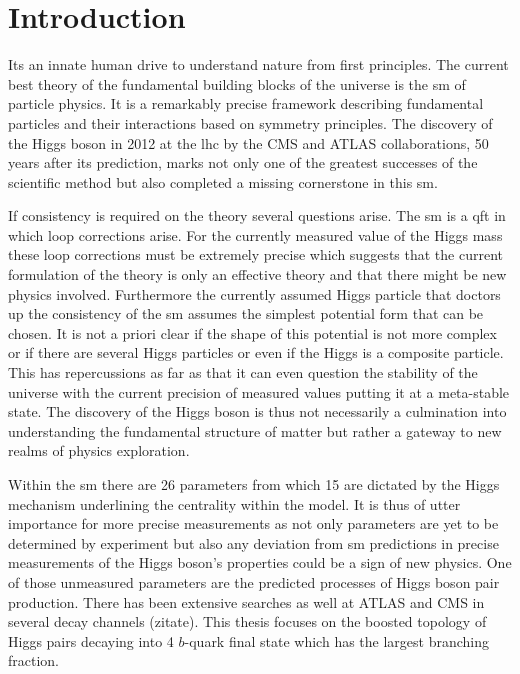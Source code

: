 \chapter{Introduction}

Its an innate human drive to understand nature from first principles. The current best theory of the fundamental building blocks of the universe is the \ac{sm} of particle physics. It is a remarkably precise framework describing fundamental particles and their interactions based on symmetry principles. The discovery of the Higgs boson in 2012 at the  \ac{lhc} by the CMS and ATLAS collaborations, 50 years after its prediction, marks not only one of the greatest successes of the scientific method but also completed a missing cornerstone in this \ac{sm}. 

If consistency is required on the theory several questions arise. The \ac{sm} is a \ac{qft} in which loop corrections arise. For the currently measured value of the Higgs mass these loop corrections must be extremely precise which suggests that the current formulation of the theory is only an effective theory and that there might be new physics involved. Furthermore the currently assumed Higgs particle that doctors up the consistency of the \ac{sm} assumes the simplest potential form that can be chosen. It is not a priori clear if the shape of this potential is not more complex or if there are several Higgs particles or even if the Higgs is a composite particle. This has repercussions as far as that it can even question the stability of the universe with the current precision of measured values putting it at a meta-stable state. The discovery of the Higgs boson is thus not necessarily a culmination into understanding the fundamental structure of matter but rather a gateway to new realms of physics exploration. 

Within the \ac{sm} there are 26 parameters from which 15 are dictated by the Higgs mechanism underlining the centrality within the model. It is thus of utter importance for more precise measurements as not only parameters are yet to be determined by experiment but also any deviation from \ac{sm} predictions in precise measurements of the Higgs boson's properties could be a sign of new physics. One of those unmeasured parameters are the predicted processes of Higgs boson pair production. There has been extensive searches as well at ATLAS and CMS in several decay channels (zitate). This thesis focuses on the boosted topology of Higgs pairs decaying into 4 $b$-quark final state which has the largest branching fraction.

